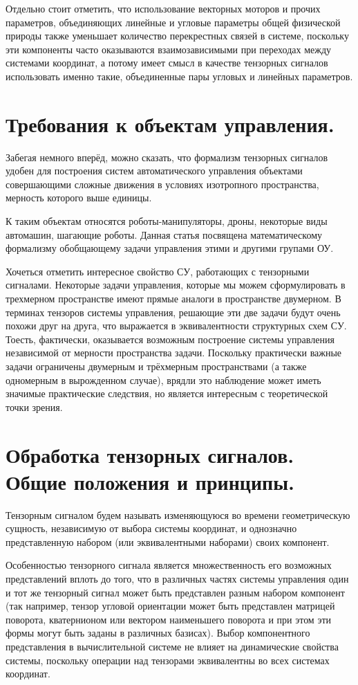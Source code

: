 \documentclass[a4paper]{article}
\begin{document}
Отдельно стоит отметить, что использование векторных моторов и прочих параметров, объединяющих линейные и угловые параметры общей физической природы также уменьшает количество перекрестных связей в системе, поскольку эти компоненты часто оказываются взаимозависимыми при переходах между системами координат, а потому имеет смысл в качестве тензорных сигналов использовать именно такие, объединенные пары угловых и линейных параметров. 

\section{Требования к объектам управления.}
Забегая немного вперёд, можно сказать, что формализм тензорных сигналов удобен для построения систем автоматического управления объектами совершающими сложные движения в условиях изотропного пространства, мерность которого выше единицы.

К таким объектам относятся роботы-манипуляторы, дроны, некоторые виды автомашин, шагающие роботы. 
Данная статья посвящена математическому формализму обобщающему задачи управления этими и другими групами ОУ.

Хочеться отметить интересное свойство СУ, работающих с тензорными сигналами. Некоторые задачи управления, которые мы можем сформулировать в трехмерном пространстве имеют прямые аналоги в пространстве двумерном. В терминах тензоров системы управления, решающие эти две задачи будут очень похожи друг на друга, что выражается в эквивалентности структурных схем СУ. Тоесть, фактически, оказывается возможным построение системы управления независимой от мерности пространства задачи. Поскольку практически важные задачи ограничены двумерным и трёхмерным пространствами (а также одномерным в вырожденном случае), врядли это наблюдение может иметь значимые практические следствия, но является интересным с теоретической точки зрения. 

\section{Обработка тензорных сигналов. Общие положения и принципы.}
Тензорным сигналом будем называть изменяющуюся во времени геометрическую сущность, независимую от выбора системы координат, и однозначно представленную набором (или эквивалентными наборами) своих компонент. 

Особенностью тензорного сигнала является множественность его возможных представлений вплоть до того, что в различных частях системы управления один и тот же тензорный сигнал может быть представлен разным набором компонент (так например, тензор угловой ориентации может быть представлен матрицей поворота, кватернионом или вектором наименьшего поворота и при этом эти формы могут быть заданы в различных базисах). Выбор компонентного представления в вычислительной системе не влияет на динамические свойства системы, поскольку операции над тензорами эквивалентны во всех системах координат.
\end{document}
